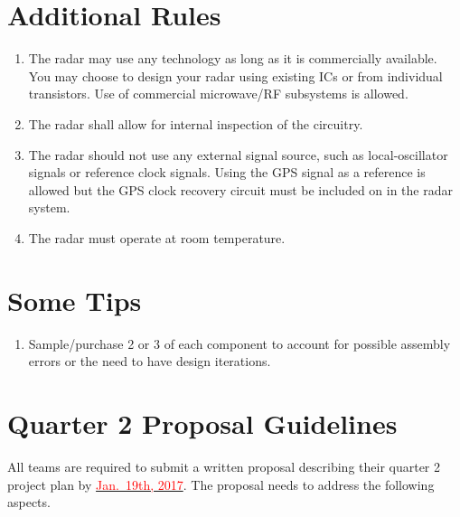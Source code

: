 \documentclass[letterpaper, 11pt]{article}
\newcommand{\due}[1]{\href{https://github.com/ucdart/UCD-EEC134/blob/master/support/schedule/eec134-schedule.pdf}{\textcolor{red}{#1}}}
\begin{document}
%	
%

\section{Additional Rules}
	\begin{enumerate}[itemsep=-0.1ex]
		
		\item The radar may use any technology as long as it is commercially available. You may choose to design your radar using existing ICs or from individual transistors. Use of commercial microwave/RF subsystems is allowed.
		
		\item The radar shall allow for internal inspection of the circuitry.
		
		\item The radar should not use any external signal source, such as local-oscillator signals or reference clock signals. Using the GPS signal as a reference is allowed but the GPS clock recovery circuit must be included on in the radar system.
		
		\item The radar must operate at room temperature. 		
	\end{enumerate}

\section{Some Tips}
\begin{enumerate}
	\item Sample/purchase 2 or 3 of each component to account for possible assembly errors or the need to have design iterations. 
\end{enumerate}

\section{Quarter 2 Proposal Guidelines}

All teams are required to submit a written proposal describing their quarter 2 project plan by \due{Jan.~19th, 2017}. The proposal needs to address the following aspects.
\end{document}
